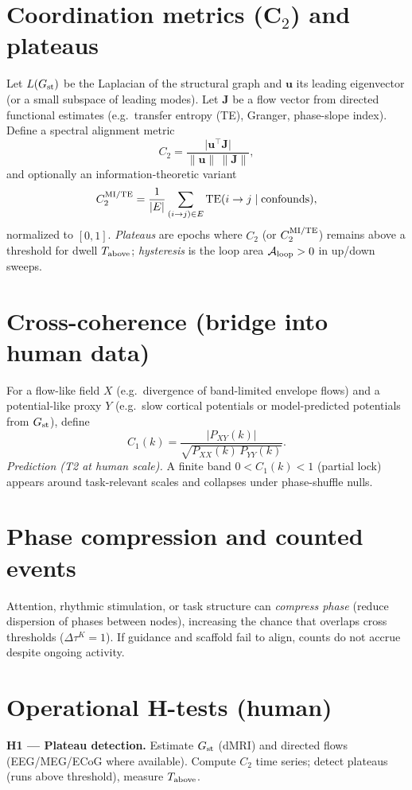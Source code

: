 \documentclass[12pt,a4paper,oneside]{scrreprt}
\begin{document}
\section{Coordination metrics (C$_2$) and plateaus}\label{sec:human-C2}
Let $L(G_{\rm st})$ be the Laplacian of the structural graph and $\mathbf u$ its leading eigenvector (or a small subspace of leading modes). 
Let $\mathbf J$ be a flow vector from directed functional estimates (e.g.\ transfer entropy (TE), Granger, phase-slope index).
Define a spectral alignment metric
\begin{equation}
C_2=\frac{\big|\mathbf u^\top \mathbf J\big|}{\|\mathbf u\|\,\|\mathbf J\|},
\end{equation}
and optionally an information-theoretic variant
\[
C_2^{\rm MI/TE}=\frac{1}{|E|}\sum_{(i\to j)\in E}\mathrm{TE}(i\to j\mid \text{confounds}),
\]
normalized to $[0,1]$.
\emph{Plateaus} are epochs where $C_2$ (or $C_2^{\rm MI/TE}$) remains above a threshold for dwell $T_{\rm above}$; \emph{hysteresis} is the loop area $\mathcal A_{\rm loop}>0$ in up/down sweeps.

\section{Cross-coherence (bridge into human data)}\label{sec:human-C1}
For a flow-like field $X$ (e.g.\ divergence of band-limited envelope flows) and a potential-like proxy $Y$ (e.g.\ slow cortical potentials or model-predicted potentials from $G_{\rm st}$), define
\[
C_1(k)=\frac{|P_{XY}(k)|}{\sqrt{P_{XX}(k)\,P_{YY}(k)}}.
\]
\emph{Prediction (T2 at human scale).} A finite band $0<C_1(k)<1$ (partial lock) appears around task-relevant scales and collapses under phase-shuffle nulls.

\section{Phase compression and counted events}\label{sec:human-phase}
Attention, rhythmic stimulation, or task structure can \emph{compress phase} (reduce dispersion of phases between nodes), increasing the chance that overlaps cross thresholds ($\Delta\tau^K=1$). 
If guidance and scaffold fail to align, counts do not accrue despite ongoing activity.

\section{Operational H-tests (human)}\label{sec:human-tests}
\textbf{H1 — Plateau detection.}
Estimate $G_{\rm st}$ (dMRI) and directed flows (EEG/MEG/ECoG where available). 
Compute $C_2$ time series; detect plateaus (runs above threshold), measure $T_{\rm above}$.
\end{document}
